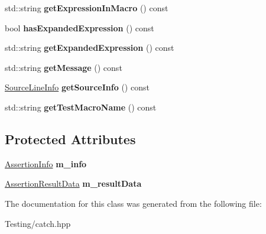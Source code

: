 \begin{DoxyCompactItemize}
\item 
\hypertarget{class_catch_1_1_assertion_result_ac368a7490af7669decd58efea7d7dc54}{std\-::string {\bfseries get\-Expression\-In\-Macro} () const }\label{class_catch_1_1_assertion_result_ac368a7490af7669decd58efea7d7dc54}

\item 
\hypertarget{class_catch_1_1_assertion_result_a122c369bd49430a304e3eaebdf184f36}{bool {\bfseries has\-Expanded\-Expression} () const }\label{class_catch_1_1_assertion_result_a122c369bd49430a304e3eaebdf184f36}

\item 
\hypertarget{class_catch_1_1_assertion_result_a675d074588875eb62b0b6e36e05d65e6}{std\-::string {\bfseries get\-Expanded\-Expression} () const }\label{class_catch_1_1_assertion_result_a675d074588875eb62b0b6e36e05d65e6}

\item 
\hypertarget{class_catch_1_1_assertion_result_a9793bfc4d24678c8a013bda84a5aa905}{std\-::string {\bfseries get\-Message} () const }\label{class_catch_1_1_assertion_result_a9793bfc4d24678c8a013bda84a5aa905}

\item 
\hypertarget{class_catch_1_1_assertion_result_a68b73fe982a97fe6432af679af1a2dad}{\hyperlink{struct_catch_1_1_source_line_info}{Source\-Line\-Info} {\bfseries get\-Source\-Info} () const }\label{class_catch_1_1_assertion_result_a68b73fe982a97fe6432af679af1a2dad}

\item 
\hypertarget{class_catch_1_1_assertion_result_a2901d41b199258ff6a44571b147169dd}{std\-::string {\bfseries get\-Test\-Macro\-Name} () const }\label{class_catch_1_1_assertion_result_a2901d41b199258ff6a44571b147169dd}

\end{DoxyCompactItemize}
\subsection*{Protected Attributes}
\begin{DoxyCompactItemize}
\item 
\hypertarget{class_catch_1_1_assertion_result_a3e7236f73a51d6fc8bb9dfdefcee7772}{\hyperlink{struct_catch_1_1_assertion_info}{Assertion\-Info} {\bfseries m\-\_\-info}}\label{class_catch_1_1_assertion_result_a3e7236f73a51d6fc8bb9dfdefcee7772}

\item 
\hypertarget{class_catch_1_1_assertion_result_add3455b8bbedb0d643e18da67c66b4f7}{\hyperlink{struct_catch_1_1_assertion_result_data}{Assertion\-Result\-Data} {\bfseries m\-\_\-result\-Data}}\label{class_catch_1_1_assertion_result_add3455b8bbedb0d643e18da67c66b4f7}

\end{DoxyCompactItemize}


The documentation for this class was generated from the following file\-:\begin{DoxyCompactItemize}
\item 
Testing/catch.\-hpp\end{DoxyCompactItemize}
